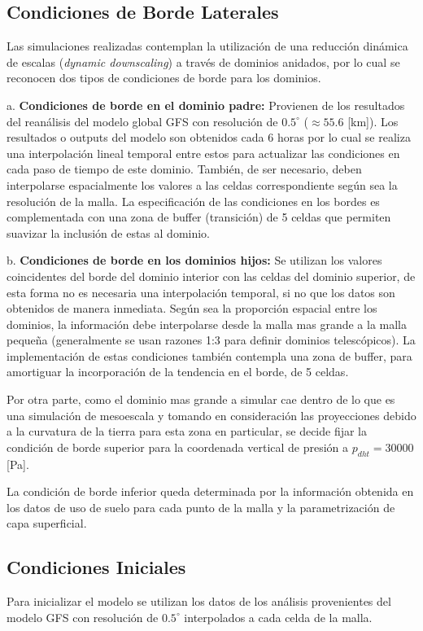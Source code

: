 \subsection{Condiciones de Borde Laterales}
Las simulaciones realizadas contemplan la utilización de una reducción dinámica de escalas (\emph{dynamic downscaling}) a través de dominios anidados, por lo cual se reconocen dos tipos de condiciones de borde para los dominios.
\begin{enumerate*}
	\item[a.] \textbf{Condiciones de borde en el dominio padre:} Provienen de los resultados del reanálisis del modelo global GFS con resolución de $0.5^\circ$ ($\approx 55.6$ [km]). Los resultados o outputs del modelo son obtenidos cada 6 horas por lo cual se realiza una interpolación lineal temporal entre estos para actualizar las condiciones en cada paso de tiempo de este dominio. También, de ser necesario, deben interpolarse espacialmente los valores a las celdas correspondiente según sea la resolución de la malla. La especificación de las condiciones en los bordes es complementada con una zona de buffer (transición) de 5 celdas que permiten suavizar la inclusión de estas al dominio.
	\item[b.] \textbf{Condiciones de borde en los dominios hijos:} Se utilizan los valores coincidentes del borde del dominio interior con las celdas del dominio superior, de esta forma no es necesaria una interpolación temporal, si no que los datos son obtenidos de manera inmediata. Según sea la proporción espacial entre los dominios, la información debe interpolarse desde la malla mas grande a la malla pequeña (generalmente se usan razones 1:3 para definir dominios telescópicos). La implementación de estas condiciones también contempla una zona de buffer, para amortiguar la incorporación de la tendencia en el borde, de 5 celdas.
\end{enumerate*}
Por otra parte, como el dominio mas grande a simular cae dentro de lo que es una simulación de mesoescala y tomando en consideración las proyecciones debido a la curvatura de la tierra para esta zona en particular, se decide fijar la condición de borde superior para la coordenada vertical de presión a $p_{dht} = 30000$ [Pa].

La condición de borde inferior queda determinada por la información obtenida en los datos de uso de suelo para cada punto de la malla y la parametrización de capa superficial.
\subsection{Condiciones Iniciales}
Para inicializar el modelo se utilizan los datos de los análisis  provenientes del modelo  GFS con resolución de $0.5^\circ$ interpolados a cada celda de la malla.

